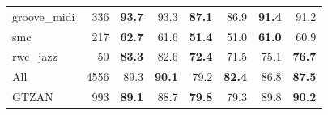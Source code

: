 \begin{table}[t]
\begin{tabular}{@{}lr rr rr rr@{}}
    groove\_midi & 336 & \textbf{93.7} & 93.3 & \textbf{87.1} & 86.9 & \textbf{91.4} & 91.2 \\
    smc & 217 & \textbf{62.7} & 61.6 & \textbf{51.4} & 51.0 & \textbf{61.0} & 60.9 \\
    rwc\_jazz & 50 & \textbf{83.3} & 82.6 & \textbf{72.4} & 71.5 & 75.1 & \textbf{76.7} \\
    \hline All & 4556 & 89.3 & \textbf{90.1} & 79.2 & \textbf{82.4} & 86.8 & \textbf{87.5} \\
    \hline GTZAN & 993 & \textbf{89.1} & 88.7 & \textbf{79.8} & 79.3 & 89.8 & \textbf{90.2} \\
    \hline
  \end{tabular}
\end{table}

